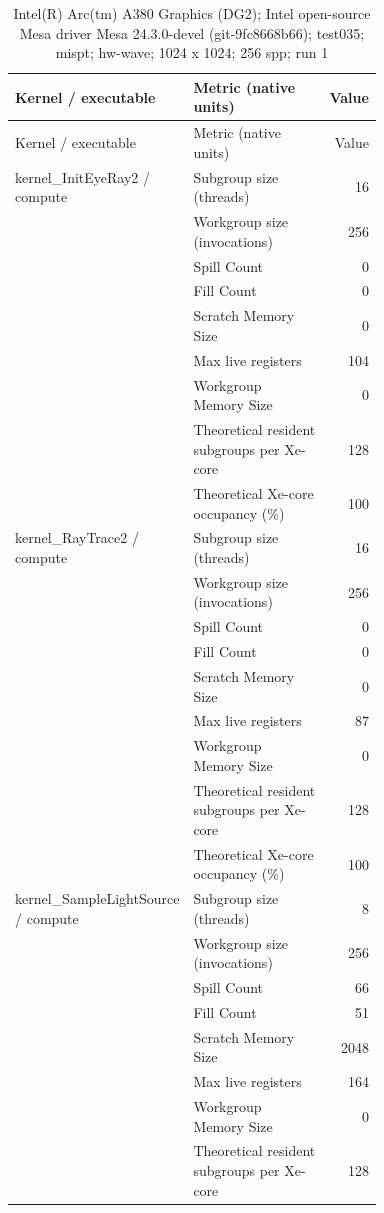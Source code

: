 \begin{longtable}{p{0.30\linewidth}p{0.43\linewidth}r}
\caption{Intel(R) Arc(tm) A380 Graphics (DG2); Intel open-source Mesa driver Mesa 24.3.0-devel (git-9fc8668b66); test035; mispt; hw-wave; 1024 x 1024; 256 spp; run 1}\label{tab:hydra-profile-2}\\
\hline Kernel / executable & Metric (native units) & Value \\\hline
\endfirsthead
\hline Kernel / executable & Metric (native units) & Value \\\hline
\endhead
kernel\_InitEyeRay2 / compute & Subgroup size (threads) & 16 \\
 & Workgroup size (invocations) & 256 \\
 & Spill Count & 0 \\
 & Fill Count & 0 \\
 & Scratch Memory Size & 0 \\
 & Max live registers & 104 \\
 & Workgroup Memory Size & 0 \\
 & Theoretical resident subgroups per Xe-core & 128 \\
 & Theoretical Xe-core occupancy (\%) & 100 \\
\hline
kernel\_RayTrace2 / compute & Subgroup size (threads) & 16 \\
 & Workgroup size (invocations) & 256 \\
 & Spill Count & 0 \\
 & Fill Count & 0 \\
 & Scratch Memory Size & 0 \\
 & Max live registers & 87 \\
 & Workgroup Memory Size & 0 \\
 & Theoretical resident subgroups per Xe-core & 128 \\
 & Theoretical Xe-core occupancy (\%) & 100 \\
\hline
kernel\_SampleLightSource / compute & Subgroup size (threads) & 8 \\
 & Workgroup size (invocations) & 256 \\
 & Spill Count & 66 \\
 & Fill Count & 51 \\
 & Scratch Memory Size & 2048 \\
 & Max live registers & 164 \\
 & Workgroup Memory Size & 0 \\
 & Theoretical resident subgroups per Xe-core & 128 \\

\end{longtable}
